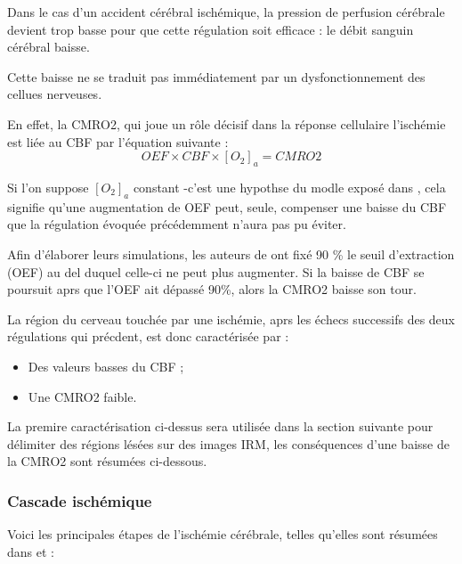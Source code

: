 \etoile
Dans le cas d'un accident c\'er\'ebral isch\'emique, la pression de perfusion c\'er\'ebrale devient trop basse pour que cette r\'egulation soit efficace : %
le d\'ebit sanguin c\'er\'ebral baisse.

\ligneinter
Cette baisse ne se traduit pas imm\'ediatement par un dysfonctionnement des cellues nerveuses.

\par
En effet, la CMRO2, qui joue un r\^ole d\'ecisif dans la r\'eponse cellulaire  l'isch\'emie est li\'ee au CBF par l'\'equation suivante \cite{bufr97} :
\begin{equation}
OEF\times CBF\times [O_2]_a=CMRO2
\label{cmro2_cbf}
\end{equation}

Si l'on suppose $[O_2]_a$ constant -c'est une hypothse du modle expos\'e dans \cite{Duval_JCBFM_02}, %
cela signifie qu'une augmentation de OEF peut, seule, compenser une baisse du CBF %
que la r\'egulation \'evoqu\'ee pr\'ec\'edemment n'aura pas pu \'eviter. 

\par
Afin d'\'elaborer leurs simulations, les auteurs de \cite{Duval_JCBFM_02} ont fix\'e  90 \% le seuil d'extraction (OEF) au del duquel celle-ci ne peut plus augmenter. %
Si la baisse de CBF se poursuit aprs que l'OEF ait d\'epass\'e 90\%, alors la CMRO2 baisse  son tour.

\etoile
La r\'egion du cerveau touch\'ee par une isch\'emie, aprs les \'echecs successifs des deux r\'egulations qui pr\'ecdent, %
est donc caract\'eris\'ee par :
\begin{itemize}
\item Des valeurs basses du CBF ;
\item Une CMRO2 faible.
\end{itemize}

La premire caract\'erisation ci-dessus sera utilis\'ee dans la section suivante pour d\'elimiter des r\'egions l\'es\'ees sur des images IRM, %
les cons\'equences d'une baisse de la CMRO2 sont r\'esum\'ees ci-dessous.

\subsubsection{Cascade isch\'emique}\label{casc}

Voici les principales \'etapes de l'isch\'emie c\'er\'ebrale, telles qu'elles sont r\'esum\'ees dans \cite{Durukan_PBB_07} et \cite{lar_poly_09}:

